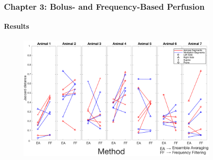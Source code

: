 \documentclass[10pt,    %
    english,            %
    xcolor=table,       %
    envcountsect,        %
    aspectratio=1610
]{beamer}
\begin{document}
\begin{frame}
	\frametitle{Chapter 3: Bolus- and Frequency-Based Perfusion}
	\framesubtitle{Results}
	\begin{figure}
		\centering
	\includegraphics[width=0.9\textwidth]{imgs/fig-resultsJaccard.pdf}
	\end{figure}
\end{frame}
\end{document}
